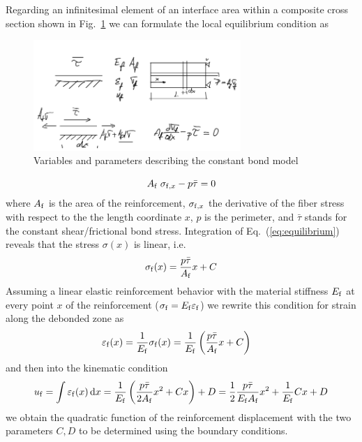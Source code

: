 \documentclass[main.tex]{subfiles}
\begin{document}
Regarding an infinitesimal element of an interface area within a composite cross section shown in Fig.~\ref{FIGConstantBondVariables} we can formulate the local equilibrium condition as
\begin{figure}[ht]
	\centering
  \includegraphics[width=0.7\textwidth]{drawings/constant_bond_variables.png}
	\caption{Variables and parameters describing the constant bond model}
	\label{FIGConstantBondVariables}
\end{figure}
\begin{equation} \label{eq:equilibrium}
A_{\mathrm{f}} \; \sigma_{\mathrm{f},x} - p \bar{\tau} =0
\end{equation}
where 
$A_{\mathrm{f}}$ is the area of the reinforcement, $\sigma_{\mathrm{f},x}$ the derivative of the fiber stress with respect to the the length coordinate $x$, $p$ is the perimeter, and $\bar{\tau}$ stands for the constant shear/frictional bond stress.
Integration of Eq.~(\ref{eq:equilibrium}) reveals that the stress $\sigma(x)$ is linear, i.e.
\begin{align}
\label{eq:stress_1}
\sigma_{\mathrm{f}}(x) = \frac{p \bar{\tau}}{A_{\mathrm{f}}} x + C
\end{align}
Assuming a linear elastic reinforcement behavior with the material stiffness $E_{\mathrm{f}}$ 
at every point $x$ of the reinforcement
($\sigma_{\mathrm{f}} = E_{\mathrm{f}} \varepsilon_{\mathrm{f}}$) we rewrite this condition 
for strain along the debonded zone as
\begin{align}
\label{eq:strain_1}
\varepsilon_{\mathrm{f}}(x) &= \frac{1}{E_{\mathrm{f}}} \sigma_{\mathrm{f}}(x) = 
\frac{1}{E_{\mathrm{f}}} \left( \frac{p \bar{\tau}}{A_{\mathrm{f}}} x + C \right)
\end{align}
and then into the kinematic condition
\begin{align}
\label{eq:const_shear_displ}
u_{\mathrm{f}} = \int \varepsilon_{\mathrm{f}}(x) \, \mathrm{d}x = 
\frac{1}{E_{\mathrm{f}}} \left( \frac{p \bar{\tau}}{2A_{\mathrm{f}}} x^2 + Cx \right)  + D
=
\frac{1}{2}
\frac{p \bar{\tau}}{E_{\mathrm{f}} A_{\mathrm{f}}} x^2 + \frac{1}{E_{\mathrm{f}}} C x + D
\end{align}
we obtain the quadratic function of the reinforcement displacement
with the two parameters $C,D$ to be determined using the boundary conditions.
\end{document}
